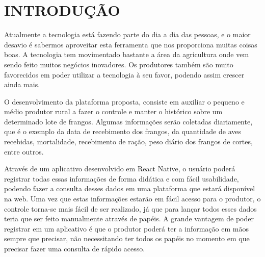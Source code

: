
\chapter{INTRODUÇÃO}
\label{chap:introducao}


Atualmente a tecnologia está fazendo parte do dia a dia das pessoas, e o maior desavio é sabermos aproveitar esta ferramenta que nos proporciona muitas coisas boas. A tecnologia tem movimentado bastante a área da agricultura onde vem sendo feito muitos negócios inovadores. Os produtores também são muito favorecidos em poder utilizar a tecnologia à seu favor, podendo assim crescer ainda mais. 

O desenvolvimento da plataforma proposta, consiste em auxiliar o pequeno e médio produtor rural a fazer o controle e manter o histórico sobre um determinado lote de frangos. Algumas informações serão coletadas diariamente, que é o exemplo da data de recebimento dos frangos, da quantidade de aves recebidas, mortalidade, recebimento de ração, peso diário dos frangos de cortes, entre outros. 

Através de um aplicativo desenvolvido em React Native, o usuário poderá registrar todas essas informações de forma didática e com fácil usabilidade, podendo fazer a consulta desses dados em uma plataforma que estará disponível na web.
Uma vez que estas informações estarão em fácil acesso para o produtor, o controle torna-se mais fácil de ser realizado, já que para lançar todos esses dados teria que ser feito manualmente através de papéis. A grande vantagem de poder registrar em um aplicativo é que o produtor poderá ter a informação em mãos sempre que precisar, não necessitando ter todos os papéis no momento em que precisar fazer uma consulta de rápido acesso.
